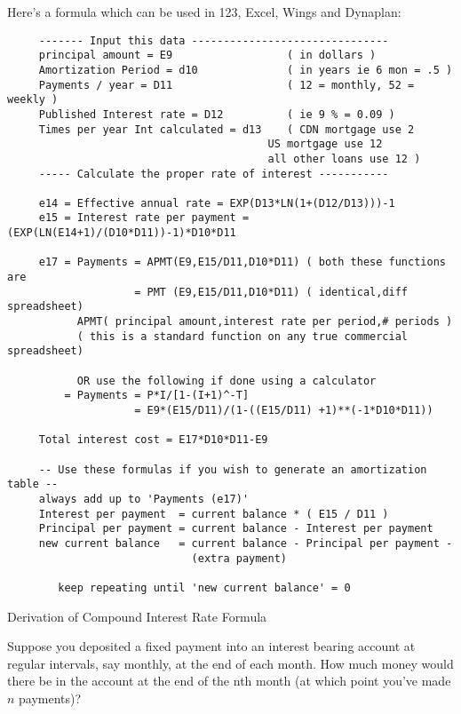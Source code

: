 Here's a formula which can be used in 123, Excel, Wings and
    Dynaplan:


\begin{verbatim}
     ------- Input this data -------------------------------
     principal amount = E9                  ( in dollars )
     Amortization Period = d10              ( in years ie 6 mon = .5 )
     Payments / year = D11                  ( 12 = monthly, 52 = weekly )
     Published Interest rate = D12          ( ie 9 % = 0.09 )
     Times per year Int calculated = d13    ( CDN mortgage use 2
                                         US mortgage use 12
                                         all other loans use 12 )
     ----- Calculate the proper rate of interest -----------

     e14 = Effective annual rate = EXP(D13*LN(1+(D12/D13)))-1
     e15 = Interest rate per payment = (EXP(LN(E14+1)/(D10*D11))-1)*D10*D11

     e17 = Payments = APMT(E9,E15/D11,D10*D11) ( both these functions are
                    = PMT (E9,E15/D11,D10*D11) ( identical,diff spreadsheet)
           APMT( principal amount,interest rate per period,# periods )
           ( this is a standard function on any true commercial spreadsheet)

           OR use the following if done using a calculator
         = Payments = P*I/[1-(I+1)^-T]
                    = E9*(E15/D11)/(1-((E15/D11) +1)**(-1*D10*D11))

     Total interest cost = E17*D10*D11-E9

     -- Use these formulas if you wish to generate an amortization table --
     always add up to 'Payments (e17)'
     Interest per payment  = current balance * ( E15 / D11 )
     Principal per payment = current balance - Interest per payment
     new current balance   = current balance - Principal per payment -
                             (extra payment)

        keep repeating until 'new current balance' = 0

\end{verbatim}

            Derivation of Compound Interest Rate Formula

     Suppose you deposited a fixed payment into an interest bearing
     account at regular intervals, say monthly, at the end of each month.
     How much money would there be in the account at the end of the nth
     month (at which point you've made $n$ payments)?

